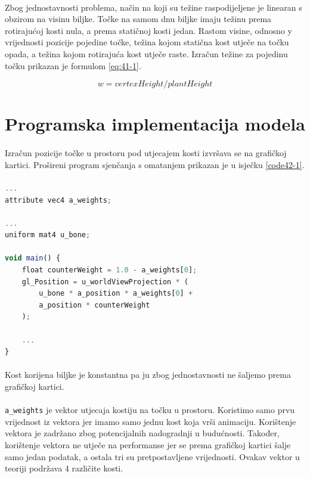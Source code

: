 \documentclass[times, utf8, diplomski]{fer}
\begin{document}
\paragraph{}
Zbog jednostavnosti problema, način na koji su težine raspodijeljene je linearan s obzirom 
na visinu biljke. Točke na samom dnu biljke imaju težinu prema rotirajućoj kosti nula, a 
prema statičnoj kosti jedan. Rastom visine, odnosno y vrijednosti pozicije pojedine točke, 
težina kojom statična kost utječe na točku opada, a težina kojom rotirajuća kost utječe 
raste. Izračun težine za pojedinu točku prikazan je formulom \ref{eq:41-1}.

\begin{equation}
w = vertexHeight / plantHeight
\label{eq:41-1}
\end{equation}

\section{Programska implementacija modela}
\paragraph{}
Izračun pozicije točke u prostoru pod utjecajem kosti izvršava se na grafičkoj kartici. Prošireni program sjenčanja s omatanjem prikazan je u isječku \ref{code42-1}.

\paragraph{}
\begin{lstlisting}[language=Javascript,label=code42-1,caption=Proširenja programa za sjenčanje omatanjem]
...
attribute vec4 a_weights;

...
uniform mat4 u_bone;

void main() {
	float counterWeight = 1.0 - a_weights[0];
	gl_Position = u_worldViewProjection * (
		u_bone * a_position * a_weights[0] +
		a_position * counterWeight
	);
	
	...
}
\end{lstlisting}

\paragraph{}
Kost korijena biljke je konstantna pa ju zbog jednostavnosti ne šaljemo prema grafičkoj 
kartici. 

\paragraph{}
\verb#a_weights# je vektor utjecaja kostiju na točku u prostoru. Koristimo samo prvu 
vrijednost iz vektora jer imamo samo jednu kost koja vrši animaciju. Korištenje vektora je 
zadržano zbog potencijalnih nadogradnji u budućnosti. Također, korištenje vektora ne utječe 
na performanse jer se prema grafičkoj kartici šalje samo jedan podatak, a ostala tri su 
pretpostavljene vrijednosti. Ovakav vektor u teoriji podržava 4 različite kosti.
\end{document}
